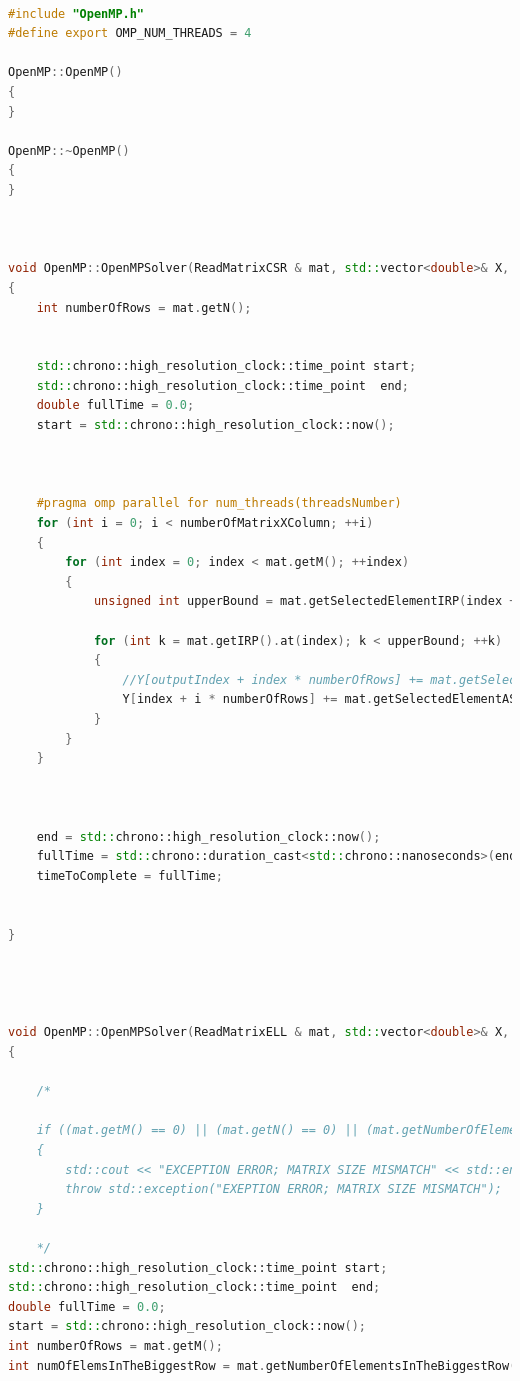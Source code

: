 \documentclass{scrreprt}
\begin{document}
\begin{lstlisting}[language=C++, caption=OpenMP.cpp]

#include "OpenMP.h"
#define export OMP_NUM_THREADS = 4

OpenMP::OpenMP()
{
}

OpenMP::~OpenMP()
{
}



void OpenMP::OpenMPSolver(ReadMatrixCSR & mat, std::vector<double>& X, std::vector<double>& Y,  int threadsNumber, double & timeToComplete, unsigned int numberOfMatrixXColumn)
{
	int numberOfRows = mat.getN();


	std::chrono::high_resolution_clock::time_point start;
	std::chrono::high_resolution_clock::time_point  end;
	double fullTime = 0.0;
	start = std::chrono::high_resolution_clock::now();

	

	#pragma omp parallel for num_threads(threadsNumber)
	for (int i = 0; i < numberOfMatrixXColumn; ++i)
	{
		for (int index = 0; index < mat.getM(); ++index)
		{
			unsigned int upperBound = mat.getSelectedElementIRP(index + 1);

			for (int k = mat.getIRP().at(index); k < upperBound; ++k)
			{
				//Y[outputIndex + index * numberOfRows] += mat.getSelectedElementAS(k) * X[mat.getSelectedElementJA(k) + index * numberOfRows];
				Y[index + i * numberOfRows] += mat.getSelectedElementAS(k) * X[mat.getSelectedElementJA(k)+ i * numberOfRows];
			}
		}
	}

		

	end = std::chrono::high_resolution_clock::now();
	fullTime = std::chrono::duration_cast<std::chrono::nanoseconds>(end - start).count() / 1000000.0;
	timeToComplete = fullTime;
	

}




void OpenMP::OpenMPSolver(ReadMatrixELL & mat, std::vector<double>& X, std::vector<double>& Y, int threadsNumber, double & timeToComplete, unsigned int numberOfMatrixXColumn)
{	

	/*
	
	if ((mat.getM() == 0) || (mat.getN() == 0) || (mat.getNumberOfElementsInTheBiggestRow() == 0) || (Y.size() != mat.getN()))
	{
		std::cout << "EXCEPTION ERROR; MATRIX SIZE MISMATCH" << std::endl;
		throw std::exception("EXEPTION ERROR; MATRIX SIZE MISMATCH");
	}
	
	*/
std::chrono::high_resolution_clock::time_point start;
std::chrono::high_resolution_clock::time_point  end;
double fullTime = 0.0;
start = std::chrono::high_resolution_clock::now();
int numberOfRows = mat.getM();
int numOfElemsInTheBiggestRow = mat.getNumberOfElementsInTheBiggestRow();
	




\end{lstlisting}
\end{document}
